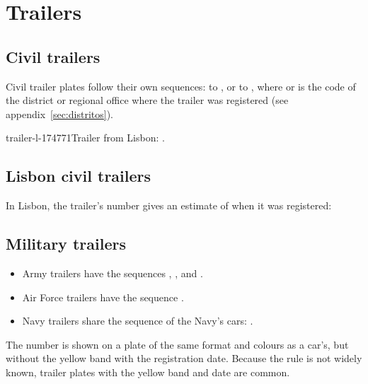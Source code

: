 \section{Trailers}

\subsection{Civil trailers}

Civil trailer plates follow their own sequences:  to ,
or  to , where  or  is the code of
the district or regional office where the trailer was registered (see
appendix~\ref{sec:distritos}).

%
          {trailer-l-174771}{Trailer from Lisbon: .}

\subsection{Lisbon civil trailers}

In Lisbon, the trailer's number gives an estimate of when it was registered:


\subsection{Military trailers}

\begin{itemize}
  \item Army trailers have the sequences , , 
        and .
  \item Air Force trailers have the sequence .
  \item Navy trailers share the sequence of the Navy's cars: .
\end{itemize}

The number is shown on a plate of the same format and colours as a car's, but
without the yellow band with the registration date. Because the rule is not
widely known, trailer plates with the yellow band and date are common.
